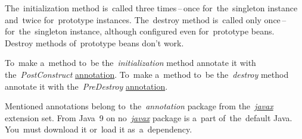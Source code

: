 \noindent The~initialization method is~called three times\,--\,once for~the~singleton instance and~twice for~prototype instances. The~destroy method is~called only once\,--\,for~the~singleton instance, although configured even for~prototype beans. Destroy methods of~prototype beans don't work.

\label{beanlifecycleannotations}
To~make a~method to~be the~\textit{initialization} method annotate it with the~\textit{PostConstruct} \hyperref[javaannotation]{annotation}. To~make a~method to~be the~\textit{destroy} method annotate it with the~\textit{PreDestroy} \hyperref[javaannotation]{annotation}.

\warning Mentioned annotations belong to~the~\textit{annotation} package from the~\hyperref[javax]{\textit{javax}} extension set. From Java~9 on no~\hyperref[javax]{\textit{javax}} package is a~part of~the~default Java. You~must download it or~load it as~a~dependency.

